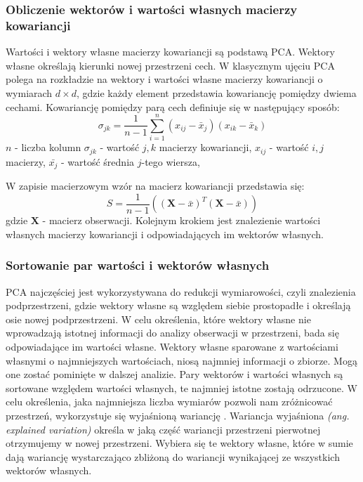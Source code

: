 \documentclass[a4paper,12pt,twoside,openany]{report}
\newcommand{\ang}[1]{\textit{(ang. #1)}}
\renewcommand{\vec}[1]{\bm{#1}}
\begin{document}
\subsubsection{Obliczenie wektorów i wartości własnych macierzy kowariancji}
Wartości i wektory własne macierzy kowariancji są podstawą PCA.
Wektory własne określają kierunki nowej przestrzeni cech.
W klasycznym ujęciu PCA polega na rozkładzie na wektory i wartości własne macierzy kowariancji o wymiarach $d \times d$,
gdzie każdy element przedstawia kowariancję pomiędzy dwiema cechami. 
Kowariancję pomiędzy parą cech definiuje się w następujący sposób:
\begin{equation}
	\sigma_{jk}=\frac{1}{n - 1}\sum_{i=1}^{n}(x_{ij}-\bar x_j)(x_{ik} - \bar x_k)
\end{equation}
$n$ - liczba kolumn
$\sigma_{jk}$ - wartość $j,k$ macierzy kowariancji,
$x_{ij}$ - wartość $i,j$ macierzy, 
$\bar{x_j}$ - wartość średnia $j$-tego wiersza,

W zapisie macierzowym wzór na macierz kowariancji przedstawia się:
\begin{equation}
	S=\frac{1}{n - 1}\left((\vec{X}-\bar x)^T(\vec{X} - \bar x)\right)
\end{equation}
gdzie $\vec X$ - macierz obserwacji.
Kolejnym krokiem jest znalezienie wartości własnych macierzy kowariancji i odpowiadających im wektorów własnych.
\subsubsection{Sortowanie par wartości i wektorów własnych}
PCA najczęściej jest wykorzystywana do redukcji wymiarowości, 
czyli znalezienia podprzestrzeni, gdzie wektory własne są względem siebie prostopadłe 
i określają osie nowej podprzestrzeni.
W celu określenia, które wektory własne nie wprowadzają istotnej informacji do analizy obserwacji w przestrzeni, bada się odpowiadające im wartości własne.
Wektory własne sparowane z wartościami własnymi o najmniejszych wartościach, 
niosą najmniej informacji o zbiorze. 
Mogą one zostać pominięte w dalszej analizie.
Pary wektorów i wartości własnych są sortowane względem wartości własnych,
te najmniej istotne zostają odrzucone.
W celu określenia, jaka najmniejsza liczba wymiarów pozwoli nam zróżnicować przestrzeń,
wykorzystuje się wyjaśnioną wariancję \cite{Bro2014}.
Wariancja wyjaśniona \ang{explained variation} określa w jaką część wariancji przestrzeni pierwotnej otrzymujemy w nowej przestrzeni.
Wybiera się te wektory własne, które w sumie dają wariancję wystarczająco zbliżoną do wariancji wynikającej ze wszystkich wektorów własnych.
\end{document}
